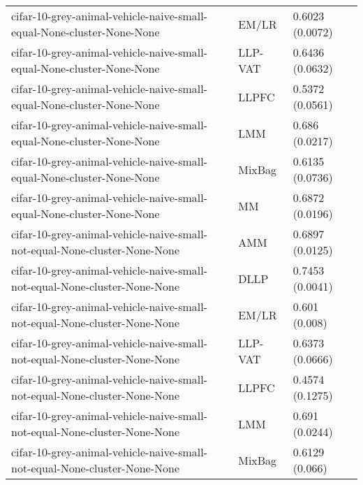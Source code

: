 \begin{longtable}{lll}
                                        cifar-10-grey-animal-vehicle-naive-small-equal-None-cluster-None-None &     EM/LR &                       0.6023 (0.0072) \\
                                        cifar-10-grey-animal-vehicle-naive-small-equal-None-cluster-None-None &   LLP-VAT &                       0.6436 (0.0632) \\
                                        cifar-10-grey-animal-vehicle-naive-small-equal-None-cluster-None-None &     LLPFC &                       0.5372 (0.0561) \\
                                        cifar-10-grey-animal-vehicle-naive-small-equal-None-cluster-None-None &       LMM &                        0.686 (0.0217) \\
                                        cifar-10-grey-animal-vehicle-naive-small-equal-None-cluster-None-None &    MixBag &                       0.6135 (0.0736) \\
                                        cifar-10-grey-animal-vehicle-naive-small-equal-None-cluster-None-None &        MM &                       0.6872 (0.0196) \\
                                    cifar-10-grey-animal-vehicle-naive-small-not-equal-None-cluster-None-None &       AMM &                       0.6897 (0.0125) \\
                                    cifar-10-grey-animal-vehicle-naive-small-not-equal-None-cluster-None-None &      DLLP &                       0.7453 (0.0041) \\
                                    cifar-10-grey-animal-vehicle-naive-small-not-equal-None-cluster-None-None &     EM/LR &                         0.601 (0.008) \\
                                    cifar-10-grey-animal-vehicle-naive-small-not-equal-None-cluster-None-None &   LLP-VAT &                       0.6373 (0.0666) \\
                                    cifar-10-grey-animal-vehicle-naive-small-not-equal-None-cluster-None-None &     LLPFC &                       0.4574 (0.1275) \\
                                    cifar-10-grey-animal-vehicle-naive-small-not-equal-None-cluster-None-None &       LMM &                        0.691 (0.0244) \\
                                    cifar-10-grey-animal-vehicle-naive-small-not-equal-None-cluster-None-None &    MixBag &                        0.6129 (0.066) \\

\end{longtable}

